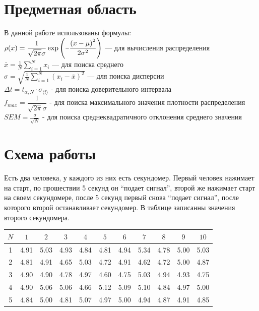 \documentclass[a4paper]{article}
\newcommand{\minus}{\scalebox{0.75}[1.0]{$-$}}
\begin{document}
\section{Предметная область}
В данной работе использованы формулы:\\
$\rho(x)=\dfrac{1}{\sqrt{2\pi}\sigma}\exp\left({\minus\dfrac{{(x-\mu)}^2}{2\sigma^2}}\right)$ --- для вычисления распределения\\
$\bar{x}=\frac{1}{N}\sum_{i=1}^N x_i$ --- для поиска среднего\\
$\sigma=\sqrt{\frac{1}{N}\sum_{i=1}^N(x_i-\bar{x})^2}$ --- для поиска дисперсии\\
$\Delta{t}=t_{\alpha,N} \cdot \sigma_{\langle t\rangle}$ - для поиска доверительного интервала\\
$f_{max}=\dfrac{1}{\sqrt{2\pi}\sigma}$ - для поиска максимального значения плотности распределения\\
$SEM = \frac{\sigma}{\sqrt{N}}$ - для поиска среднеквадратичного отклонения среднего значения\\

\fontsize{10pt}{23pt}\selectfont




\section{Схема работы}
\fontsize{10pt}{14pt}\selectfont
Есть два человека, у каждого из них есть секундомер. Первый человек нажимает на старт, по прошествии 5 секунд он ``подает сигнал'', второй же нажимает старт на своем секундомере, после 5 секунд первый снова ``подает сигнал'', после которого второй останавливает секундомер. В таблице записанны значения второго секундомера.
\begin{table}[H]
	\begin{tabular}{|c|c|c|c|c|c|c|c|c|c|c|}
		\hline
		$N$ & $1$ & $2$ & $3$ & $4$ & $5$ & $6$ & $7$ & $8$ & $9$ & $10$\\
		\hline
		1 & 4.91 & 5.03 & 4.93 & 4.84 & 4.81 & 4.94 & 5.34 & 4.78 & 5.00 & 5.03\\
		2 & 4.81 & 4.91 & 4.65 & 5.03 & 4.72 & 4.91 & 4.62 & 4.72 & 5.00 & 4.87\\
		3 & 4.90 & 4.90 & 4.78 & 4.97 & 4.60 & 4.75 & 5.03 & 4.94 & 4.93 & 4.75\\
		4 & 4.90 & 5.06 & 5.06 & 4.66 & 5.12 & 5.09 & 5.10 & 4.84 & 4.97 & 5.00\\
		5 & 4.84 & 5.00 & 4.81 & 5.07 & 4.97 & 5.00 & 4.94 & 4.87 & 4.91 & 4.85\\
		\hline

	\end{tabular}
\end{table}
\end{document}
